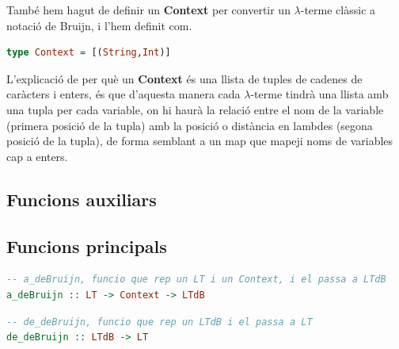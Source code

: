 \documentclass[10pt,a4paper]{article}
\begin{document}
També hem hagut de definir un \textbf{Context} per convertir un $\lambda$-terme clàssic a notació de Bruijn, i l'hem definit com.

\begin{lstlisting}[language=Haskell]
type Context = [(String,Int)]
\end{lstlisting}

L'explicació de per què un \textbf{Context} és una llista de tuples de cadenes de caràcters i enters, és que d'aquesta manera cada $\lambda$-terme tindrà una llista amb una tupla per cada variable, on hi haurà la relació entre el nom de la variable (primera posició de la tupla) amb la posició o distància en lambdes (segona posició de la tupla), de forma semblant a un map que mapeji noms de variables cap a enters.

\clearpage

\subsection{Funcions auxiliars}

\clearpage

\subsection{Funcions principals}

\begin{lstlisting}[language=Haskell]
-- a_deBruijn, funcio que rep un LT i un Context, i el passa a LTdB
a_deBruijn :: LT -> Context -> LTdB
\end{lstlisting}

\begin{lstlisting}[language=Haskell]
-- de_deBruijn, funcio que rep un LTdB i el passa a LT
de_deBruijn :: LTdB -> LT
\end{lstlisting}
\end{document}
